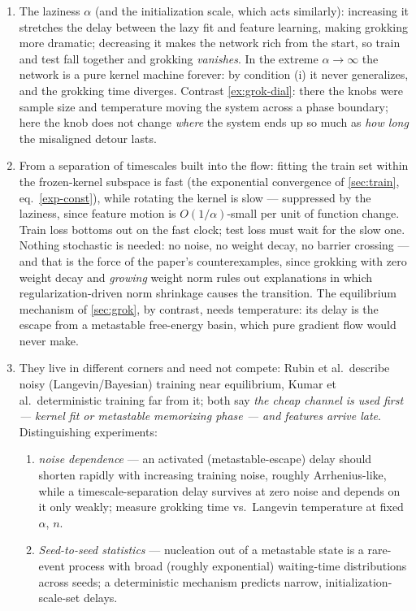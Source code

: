 \documentclass[11pt]{article}
\begin{document}
\begin{solution}
\begin{enumerate}
    \item The laziness $\alpha$ (and the initialization scale, which acts similarly): increasing it stretches the delay between the lazy fit and feature learning, making grokking more dramatic; decreasing it makes the network rich from the start, so train and test fall together and grokking \emph{vanishes}. In the extreme $\alpha\to\infty$ the network is a pure kernel machine forever: by condition (i) it never generalizes, and the grokking time diverges. Contrast \cref{ex:grok-dial}: there the knobs were sample size and temperature moving the system across a phase boundary; here the knob does not change \emph{where} the system ends up so much as \emph{how long} the misaligned detour lasts.
    \item From a separation of timescales built into the flow: fitting the train set within the frozen-kernel subspace is fast (the exponential convergence of \cref{sec:train}, eq.\ \eqref{exp-const}), while rotating the kernel is slow --- suppressed by the laziness, since feature motion is $O(1/\alpha)$-small per unit of function change. Train loss bottoms out on the fast clock; test loss must wait for the slow one. Nothing stochastic is needed: no noise, no weight decay, no barrier crossing --- and that is the force of the paper's counterexamples, since grokking with zero weight decay and \emph{growing} weight norm rules out explanations in which regularization-driven norm shrinkage causes the transition. The equilibrium mechanism of \cref{sec:grok}, by contrast, needs temperature: its delay is the escape from a metastable free-energy basin, which pure gradient flow would never make.
    \item They live in different corners and need not compete: Rubin et al.\ describe noisy (Langevin/Bayesian) training near equilibrium, Kumar et al.\ deterministic training far from it; both say \emph{the cheap channel is used first --- kernel fit or metastable memorizing phase --- and features arrive late}. Distinguishing experiments:
\begin{enumerate}
  \item \emph{noise dependence} --- an activated (metastable-escape) delay should shorten rapidly with increasing training noise, roughly Arrhenius-like, while a timescale-separation delay survives at zero noise and depends on it only weakly; measure grokking time vs.\ Langevin temperature at fixed $\alpha$, $n$.
  \item \emph{Seed-to-seed statistics} --- nucleation out of a metastable state is a rare-event process with broad (roughly exponential) waiting-time distributions across seeds; a deterministic mechanism predicts narrow, initialization-scale-set delays.

\end{enumerate}
\end{enumerate}
\end{solution}
\end{document}
